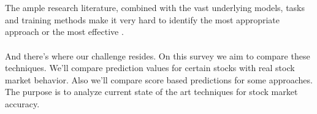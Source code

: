 \documentclass[conference]{IEEEtran}
\begin{document}
\\\\
The ample research literature, combined with the vast underlying models, tasks and training methods make it very
hard to identify the most appropriate approach or the most effective \cite{raghu2020survey}.
\\\\
And there's where our challenge resides. On this survey we aim to compare these techniques. We'll compare prediction values for certain stocks with real stock market behavior. Also we'll compare score based predictions for some approaches.
The purpose is to analyze current state of the art techniques for stock market accuracy\cite{Singh2016}.
\end{document}
